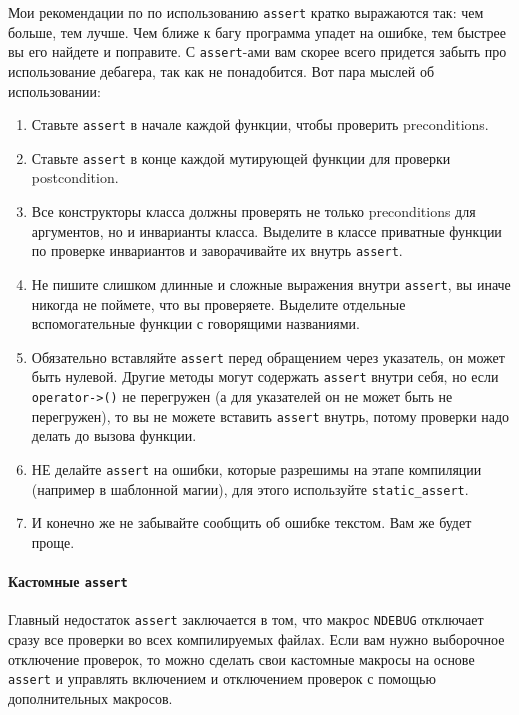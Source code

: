 Мои рекомендации по по использованию \verb"assert" кратко выражаются так: чем больше, тем лучше.
Чем ближе к багу программа упадет на ошибке, тем быстрее вы его найдете и поправите.
С \verb"assert"-ами вам скорее всего придется забыть про использование дебагера, так как не понадобится.
Вот пара мыслей об использовании:
\begin{enumerate}
\item  Ставьте \verb"assert" в начале каждой функции, чтобы проверить preconditions.

\item Ставьте \verb"assert" в конце каждой мутирующей функции для проверки postcondition.

\item Все конструкторы класса должны проверять не только preconditions для аргументов, но и инварианты класса.
Выделите в классе приватные функции по проверке инвариантов и заворачивайте их внутрь \verb"assert".

\item Не пишите слишком длинные и сложные выражения внутри \verb"assert", вы иначе никогда не поймете, что вы проверяете.
Выделите отдельные вспомогательные функции с говорящими названиями.

\item Обязательно вставляйте \verb"assert" перед обращением через указатель, он может быть нулевой.
Другие методы могут содержать \verb"assert" внутри себя, но если \verb"operator->()" не перегружен (а для указателей он не может быть не перегружен), то вы не можете вставить \verb"assert" внутрь, потому проверки надо делать до вызова функции.

\item НЕ делайте \verb"assert" на ошибки, которые разрешимы на этапе компиляции (например в шаблонной магии), для этого используйте \verb"static_assert".

\item И конечно же не забывайте сообщить об ошибке текстом.
Вам же будет проще.
\end{enumerate}


\paragraph{Кастомные \texttt{assert}}

Главный недостаток \verb"assert" заключается в том, что макрос \verb"NDEBUG" отключает сразу все проверки во всех компилируемых файлах.
Если вам нужно выборочное отключение проверок, то можно сделать свои кастомные макросы на основе \verb"assert" и управлять включением и отключением проверок с помощью дополнительных макросов.


